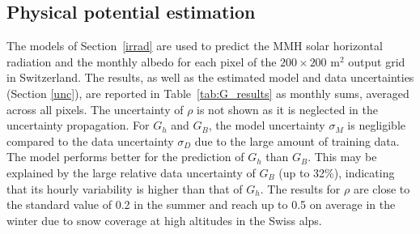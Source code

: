 \subsection{Physical potential estimation}
\label{phys}

The models of Section~\ref{irrad} are used to predict the MMH solar horizontal radiation and the monthly albedo for each pixel of the $200\times200$ m$^2$ output grid in Switzerland. 
The results, as well as the estimated model and data uncertainties (Section \ref{unc}), are reported in Table~\ref{tab:G_results} as monthly sums, averaged across all pixels. The uncertainty of $\rho$ is not shown as it is neglected in the uncertainty propagation.
For $G_h$ and $G_B$, the model uncertainty $\sigma_M$ is negligible compared to the data uncertainty $\sigma_D$ due to the large amount of training data.
The model performs better for the prediction of $G_h$ than $G_B$. This may be explained by the large relative data uncertainty of $G_B$ (up to 32\%), indicating that its hourly variability is higher than that of $G_h$. 
The results for $\rho$ are close to the standard value of 0.2 in the summer and reach up to 0.5 on average in the winter due to snow coverage at high altitudes in the Swiss alps.

